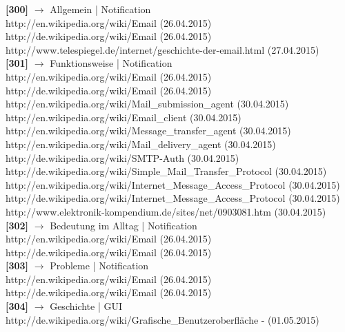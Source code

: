 \documentclass[12pt,a4paper]{report}
\begin{document}
\begin{onehalfspace}
\noindent
\textbf{[300]} $\rightarrow$  Allgemein | Notification\\
http://en.wikipedia.org/wiki/Email (26.04.2015)\\
http://de.wikipedia.org/wiki/Email (26.04.2015)\\
http://www.telespiegel.de/internet/geschichte-der-email.html (27.04.2015)\\

\noindent
\textbf{[301]} $\rightarrow$  Funktionsweise | Notification\\
http://en.wikipedia.org/wiki/Email (26.04.2015)\\
http://de.wikipedia.org/wiki/Email (26.04.2015)\\
http://en.wikipedia.org/wiki/Mail\_submission\_agent (30.04.2015)\\
http://en.wikipedia.org/wiki/Email\_client (30.04.2015)\\
http://en.wikipedia.org/wiki/Message\_transfer\_agent (30.04.2015)\\
http://en.wikipedia.org/wiki/Mail\_delivery\_agent (30.04.2015)\\
http://de.wikipedia.org/wiki/SMTP-Auth (30.04.2015)\\
http://de.wikipedia.org/wiki/Simple\_Mail\_Transfer\_Protocol (30.04.2015)\\
http://en.wikipedia.org/wiki/Internet\_Message\_Access\_Protocol (30.04.2015)\\
http://de.wikipedia.org/wiki/Internet\_Message\_Access\_Protocol (30.04.2015)\\
http://www.elektronik-kompendium.de/sites/net/0903081.htm (30.04.2015)\\

\noindent
\textbf{[302]} $\rightarrow$  Bedeutung im Alltag | Notification\\
http://en.wikipedia.org/wiki/Email (26.04.2015)\\
http://de.wikipedia.org/wiki/Email (26.04.2015)\\

\noindent
\textbf{[303]} $\rightarrow$ Probleme | Notification \\
http://en.wikipedia.org/wiki/Email (26.04.2015)\\
http://de.wikipedia.org/wiki/Email (26.04.2015)\\

\noindent
\textbf{[304]} $\rightarrow$ Geschichte | GUI \\
http://de.wikipedia.org/wiki/Grafische\_Benutzeroberfläche - (01.05.2015)\\


\end{onehalfspace}
\end{document}
